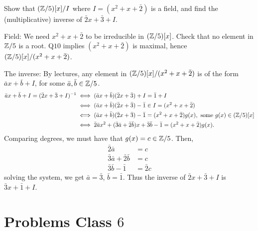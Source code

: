 \documentclass[10pt, a4paper]{article}
\begin{document}
\begin{problem}
    Show that $(\mathbb{Z} / 5)[x] / I$ where $I = (x ^ 2 + x + \bar{2})$ is a field,
    and find the
    (multiplicative)
    inverse of $\bar{2}x + \bar{3} + I$.

    \begin{solution}
        Field:
        We need $x ^ 2 + x + \bar{2}$ to be irreducible in $(\mathbb{Z} / 5)[x]$.
        Check that no element in $\mathbb{Z} / 5$ is a root.
        Q$10$ implies $(x ^ 2 + x + \bar{2})$ is maximal,
        hence $(\mathbb{Z} / 5)[x] / (x ^ 2 + x + \bar{2})$.

        The inverse:
        By lectures,
        any element in $(\mathbb{Z} / 5)[x] / (x ^ 2 + x + \bar{2})$ is of the form $\bar{a}x + \bar{b} + I$,
        for some $\bar{a}, \bar{b} \in \mathbb{Z} / 5$.
        \begin{align*}
            \bar{a}x + \bar{b} + I= (\bar{2}x + \bar{3} + I) ^ {-1} &\iff (\bar{a}x + \bar{b})(\bar{2}x + \bar{3}) + I = \bar{1} + I \\
            &\iff (\bar{a}x + \bar{b})(\bar{2}x + \bar{3}) - \bar{1} \in I = (x ^ 2 + x + \bar{2}) \\
            &\iff (\bar{a}x + \bar{b})(\bar{2}x + \bar{3}) - \bar{1} = (x ^ 2 + x + \bar{2})g(x),\text{ some $g(x) \in (\mathbb{Z} / 5)[x]$} \\
            &\iff \bar{2}\bar{a}x ^ 2 + (\bar{3}\bar{a} + \bar{2}\bar{b})x + \bar{3}\bar{b} - \bar{1} = (x ^ 2 + x + \bar{2})g(x).
        \end{align*}
        Comparing degrees,
        we must have that $g(x) = c \in \mathbb{Z} / 5$.
        Then,
        \begin{align*}
            \bar{2}\bar{a} &= c \\
            \bar{3}\bar{a} + \bar{2}\bar{b} &= c \\
            \bar{3}\bar{b} - \bar{1} &= \bar{2}c
        \end{align*}
        solving the system,
        we get $\bar{a} = \bar{3}$,
        $\bar{b} = \bar{1}$.
        Thus the inverse of $\bar{2}x + \bar{3} + I$ is $\bar{3}x + \bar{1} + I$.
    \end{solution}
\end{problem}

\newpage

\section{Problems Class \texorpdfstring{$6$}{}}
\end{document}
